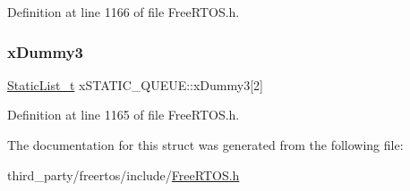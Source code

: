 Definition at line 1166 of file Free\+R\+T\+O\+S.\+h.

\mbox{\label{structxSTATIC__QUEUE_add0de93e08b632124122850bcd543597}} 
\subsubsection{\texorpdfstring{x\+Dummy3}{xDummy3}}
{\footnotesize\ttfamily \hyperlink{FreeRTOS_8h_a9735ad9101a2bd25f83a62089a4acee6}{Static\+List\+\_\+t} x\+S\+T\+A\+T\+I\+C\+\_\+\+Q\+U\+E\+U\+E\+::x\+Dummy3\mbox{[}2\mbox{]}}



Definition at line 1165 of file Free\+R\+T\+O\+S.\+h.



The documentation for this struct was generated from the following file\+:\begin{DoxyCompactItemize}
\item 
third\+\_\+party/freertos/include/\hyperlink{FreeRTOS_8h}{Free\+R\+T\+O\+S.\+h}\end{DoxyCompactItemize}

